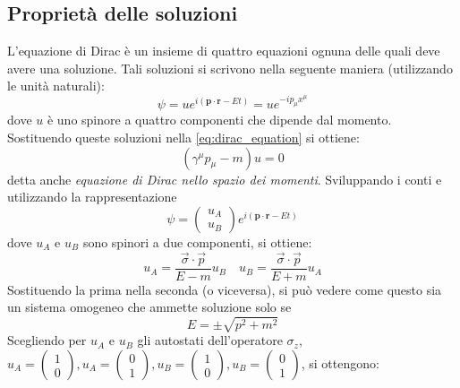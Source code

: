 \documentclass{subnucbo}
\begin{document}
\subsection{Proprietà delle soluzioni}
L'equazione di Dirac è un insieme di quattro equazioni ognuna delle quali deve avere una soluzione.
Tali soluzioni si scrivono nella seguente maniera (utilizzando le unità naturali):
\begin{equation}
        \psi = u e ^ { i ( \mathbf { p } \cdot \mathbf { r } - E t ) } = u e ^ { - i p _ { \mu } x ^ { \mu } }
        \label{eq:dirac_sol}
\end{equation}
dove $u$ è uno spinore a quattro componenti che dipende dal momento. Sostituendo queste soluzioni nella \ref{eq:dirac_equation} si ottiene:
\begin{equation}
        \left( \gamma ^ { \mu } p _ { \mu } - m \right) u = 0
        \label{eq:dirac_eq_momentum}
\end{equation}
detta anche \textit{equazione di Dirac nello spazio dei momenti}. Sviluppando i conti e utilizzando la rappresentazione
\begin{equation}
        \psi = \left( \begin{array} { l } { u_{A} } \\ { u_{B} } \end{array} \right) e ^ { i ( \mathbf { p } \cdot \mathbf { r } - E t ) }
        \label{eq:dirac_sol_spinors}
\end{equation}
dove $u_{A}$ e $u_{B}$ sono spinori a due componenti, si ottiene:
\begin{equation}
        u _ { A } = \frac { \vec { \sigma } \cdot \vec { p } } { E - m } u _ { B } \quad u _ { B } = \frac { \vec { \sigma } \cdot \vec { p } } { E + m } u _ { A }
\end{equation}
Sostituendo la prima nella seconda (o viceversa), si può vedere come questo sia un sistema omogeneo che ammette soluzione solo se
\begin{equation}
        E = \pm \sqrt { p ^ { 2 } + m ^ { 2 } }
        \label{eq:energy}
\end{equation}
Scegliendo per $u_{A}$ e $u_{B}$ gli autostati dell'operatore $\sigma_{z}$, $u _ { A } = \left( \begin{array} { c } { 1 } \\ { 0 } \end{array} \right) , u _ { A } = \left( \begin{array} { l } { 0 } \\ { 1 } \end{array} \right), u _ { B } = \left( \begin{array} { c } { 1 } \\ { 0 } \end{array} \right) , u _ { B } = \left( \begin{array} { l } { 0 } \\ { 1 } \end{array} \right)$, si ottengono:
\end{document}
